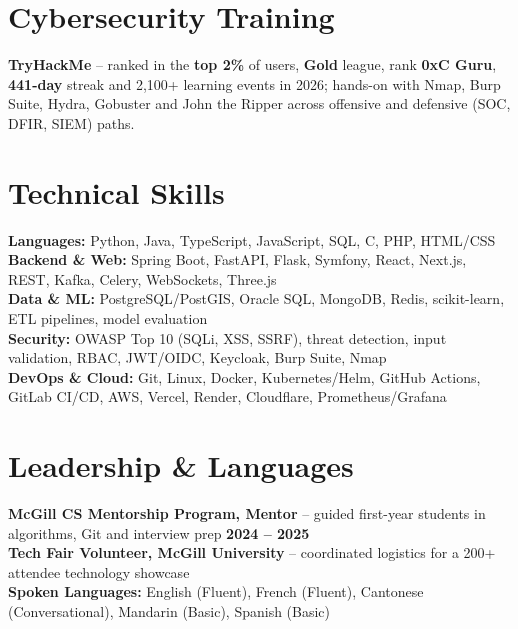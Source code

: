 \documentclass[letterpaper,9pt]{extarticle}
\begin{document}
\section{Cybersecurity Training}
\textbf{TryHackMe} -- ranked in the \textbf{top 2\%} of users, \textbf{Gold} league, rank \textbf{0xC Guru}, \textbf{441-day} streak and 2,100+ learning events in 2026; hands-on with Nmap, Burp Suite, Hydra, Gobuster and John the Ripper across offensive and defensive (SOC, DFIR, SIEM) paths.

\section{Technical Skills}
\textbf{Languages:} Python, Java, TypeScript, JavaScript, SQL, C, PHP, HTML/CSS\\
\textbf{Backend \& Web:} Spring Boot, FastAPI, Flask, Symfony, React, Next.js, REST, Kafka, Celery, WebSockets, Three.js\\
\textbf{Data \& ML:} PostgreSQL/PostGIS, Oracle SQL, MongoDB, Redis, scikit-learn, ETL pipelines, model evaluation\\
\textbf{Security:} OWASP Top 10 (SQLi, XSS, SSRF), threat detection, input validation, RBAC, JWT/OIDC, Keycloak, Burp Suite, Nmap\\
\textbf{DevOps \& Cloud:} Git, Linux, Docker, Kubernetes/Helm, GitHub Actions, GitLab CI/CD, AWS, Vercel, Render, Cloudflare, Prometheus/Grafana

\section{Leadership \& Languages}
\textbf{McGill CS Mentorship Program, Mentor} -- guided first-year students in algorithms, Git and interview prep \hfill \textbf{2024 -- 2025}\\
\textbf{Tech Fair Volunteer, McGill University} -- coordinated logistics for a 200+ attendee technology showcase\\
\textbf{Spoken Languages:} English (Fluent), French (Fluent), Cantonese (Conversational), Mandarin (Basic), Spanish (Basic)
\end{document}
